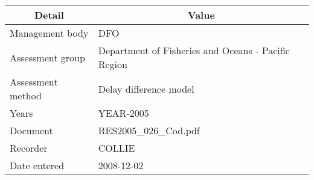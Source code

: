 \begin{table}[htb]
\centering
\begin{tabular}{lp{7cm}}
\toprule
\multicolumn{1}{c}{\textbf{Detail}} & \multicolumn{1}{c}{\textbf{Value}} \\
\midrule
Management body   & DFO                                                 \\
Assessment group  & Department of Fisheries and Oceans - Pacific Region \\
Assessment method & Delay difference model                              \\
Years             & YEAR-2005                                           \\
Document          & RES2005\_026\_Cod.pdf                               \\
Recorder          & COLLIE                                              \\
Date entered      & 2008-12-02                                          \\
\bottomrule
\end{tabular}
\label{tab:assessdet}
\end{table}
